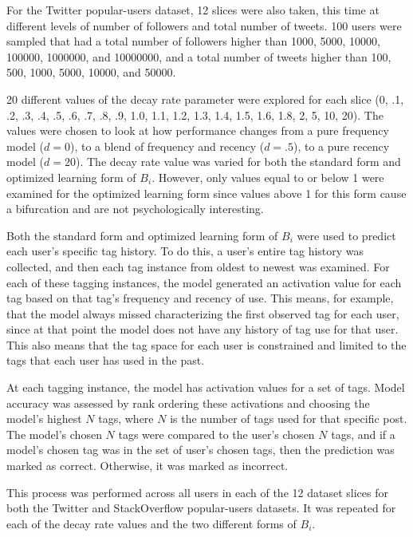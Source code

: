 \documentclass[man,floatsintext,donotrepeattitle]{apa6}
\begin{document}
For the Twitter popular-users dataset, 12 slices were also taken, this time at different levels of number of followers and total number of tweets.
100 users were sampled that had a total number of followers higher than \num{1000}, \num{5000}, \num{10000}, \num{100000}, \num{1000000}, and \num{10000000},
and a total number of tweets higher than \num{100}, \num{500}, \num{1000}, \num{5000}, \num{10000}, and \num{50000}.

20 different values of the decay rate parameter were explored for each slice
(0, .1, .2, .3, .4, .5, .6, .7, .8, .9, 1.0, 1.1, 1.2, 1.3, 1.4, 1.5, 1.6, 1.8, 2, 5, 10, 20).
The values were chosen to look at how performance changes from a pure frequency model ($d=0$), to a blend of frequency and recency ($d=.5$), to a pure recency model ($d=20$).
The decay rate value was varied for both the standard form and optimized learning form of $B_{i}$. 
However, only values equal to or below 1 were examined for the optimized learning form since values above 1 for this form cause a bifurcation and are not psychologically interesting.

Both the standard form and optimized learning form of $B_{i}$ were used to predict each user's specific tag history.
To do this, a user's entire tag history was collected, and then each tag instance from oldest to newest was examined.
For each of these tagging instances, the model generated an activation value for each tag based on that tag's frequency and recency of use. 
This means, for example, that the model always missed characterizing the first observed tag for each user, since at that point the model does not have any history of tag use for that user.
This also means that the tag space for each user is constrained and limited to the tags that each user has used in the past.

At each tagging instance, the model has activation values for a set of tags.
Model accuracy was assessed by rank ordering these activations and choosing the model's highest $N$ tags, where $N$ is the number of tags used for that specific post.
The model's chosen $N$ tags were compared to the user's chosen $N$ tags, and if a model's chosen tag was in the set of user's chosen tags, then the prediction was marked as correct.
Otherwise, it was marked as incorrect.

This process was performed across all users in each of the 12 dataset slices for both the Twitter and StackOverflow popular-users datasets.
It was repeated for each of the decay rate values and the two different forms of $B_{i}$.
\end{document}
